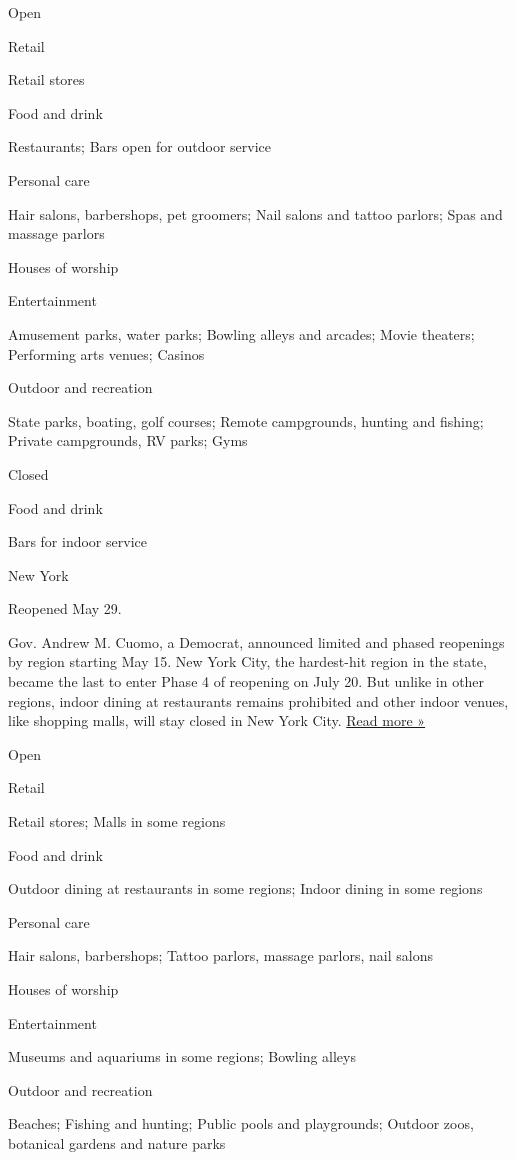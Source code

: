 Open

Retail

Retail stores

Food and drink

Restaurants; Bars open for outdoor service

Personal care

Hair salons, barbershops, pet groomers; Nail salons and tattoo parlors;
Spas and massage parlors

Houses of worship

Entertainment

Amusement parks, water parks; Bowling alleys and arcades; Movie
theaters; Performing arts venues; Casinos

Outdoor and recreation

State parks, boating, golf courses; Remote campgrounds, hunting and
fishing; Private campgrounds, RV parks; Gyms

Closed

Food and drink

Bars for indoor service

New York

Reopened May 29.

Gov. Andrew M. Cuomo, a Democrat, announced limited and phased
reopenings by region starting May 15. New York City, the hardest-hit
region in the state, became the last to enter Phase 4 of reopening on
July 20. But unlike in other regions, indoor dining at restaurants
remains prohibited and other indoor venues, like shopping malls, will
stay closed in New York City.
\href{https://www.nytimes3xbfgragh.onion/2020/07/20/nyregion/nyc-phase-4-reopening-bars.html}{Read
more »}

Open

Retail

Retail stores; Malls in some regions

Food and drink

Outdoor dining at restaurants in some regions; Indoor dining in some
regions

Personal care

Hair salons, barbershops; Tattoo parlors, massage parlors, nail salons

Houses of worship

Entertainment

Museums and aquariums in some regions; Bowling alleys

Outdoor and recreation

Beaches; Fishing and hunting; Public pools and playgrounds; Outdoor
zoos, botanical gardens and nature parks

